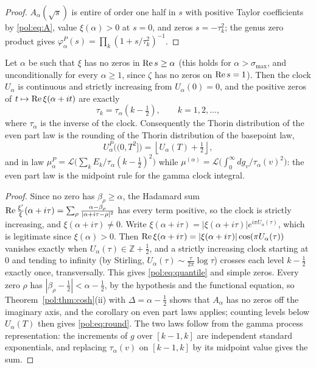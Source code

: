 \begin{proof}
$A_\alpha(\sqrt s)$ is entire of order one half in $s$ with positive Taylor coefficients by \eqref{pol:eq:A}, value $\xi(\alpha)>0$ at $s=0$, and zeros $s=-\tau_k^2$; the genus zero product gives $\varphi^P_\alpha(s)=\prod_k(1+s/\tau_k^2)^{-1}$.
\end{proof}

\begin{proposition}\label{pol:prop:round}
Let $\alpha$ be such that $\xi$ has no zeros in $\operatorname{Re} s\ge\alpha$ (this holds for $\alpha>\sigma_{\max}$, and unconditionally for every $\alpha\ge1$, since $\zeta$ has no zeros on $\operatorname{Re} s=1$). Then the clock $U_\alpha$ is continuous and strictly increasing from $U_\alpha(0)=0$, and the positive zeros of $t\mapsto\operatorname{Re}\xi(\alpha+it)$ are exactly
\begin{equation}\label{pol:eq:quantile}
\tau_k=\tau_\alpha\!\left(k-\tfrac12\right),\qquad k=1,2,\dots,
\end{equation}
where $\tau_\alpha$ is the inverse of the clock. Consequently the Thorin distribution of the even part law is the rounding of the Thorin distribution of the basepoint law,
\begin{equation}\label{pol:eq:round}
U^P_\alpha\big((0,T^2]\big)=\left\lfloor U_\alpha(T)+\tfrac12\right\rfloor,
\end{equation}
and in law $\mu^P_\alpha=\mathcal L\big(\sum_kE_k/\tau_\alpha(k-\tfrac12)^2\big)$ while $\mu^{(\alpha)}=\mathcal L\big(\int_0^\infty dg_v/\tau_\alpha(v)^2\big)$: the even part law is the midpoint rule for the gamma clock integral.
\end{proposition}

\begin{proof}
Since no zero has $\beta_\rho\ge\alpha$, the Hadamard sum $\operatorname{Re}\frac{\xi'}{\xi}(\alpha+i\tau)=\sum_\rho\frac{\alpha-\beta_\rho}{|\alpha+i\tau-\rho|^2}$ has every term positive, so the clock is strictly increasing, and $\xi(\alpha+i\tau)\ne0$. Write $\xi(\alpha+i\tau)=|\xi(\alpha+i\tau)|e^{i\pi U_\alpha(\tau)}$, which is legitimate since $\xi(\alpha)>0$. Then $\operatorname{Re}\xi(\alpha+i\tau)=|\xi(\alpha+i\tau)|\cos(\pi U_\alpha(\tau))$ vanishes exactly when $U_\alpha(\tau)\in\mathbb Z+\frac12$, and a strictly increasing clock starting at $0$ and tending to infinity (by Stirling, $U_\alpha(\tau)\sim\frac\tau{2\pi}\log\tau$) crosses each level $k-\frac12$ exactly once, transversally. This gives \eqref{pol:eq:quantile} and simple zeros. Every zero $\rho$ has $|\beta_\rho-\frac12|<\alpha-\frac12$, by the hypothesis and the functional equation, so Theorem~\ref{pol:thm:cosh}(ii) with $\Delta=\alpha-\frac12$ shows that $A_\alpha$ has no zeros off the imaginary axis, and the corollary on even part laws applies; counting levels below $U_\alpha(T)$ then gives \eqref{pol:eq:round}. The two laws follow from the gamma process representation: the increments of $g$ over $[k-1,k]$ are independent standard exponentials, and replacing $\tau_\alpha(v)$ on $[k-1,k]$ by its midpoint value gives the sum.
\end{proof}

